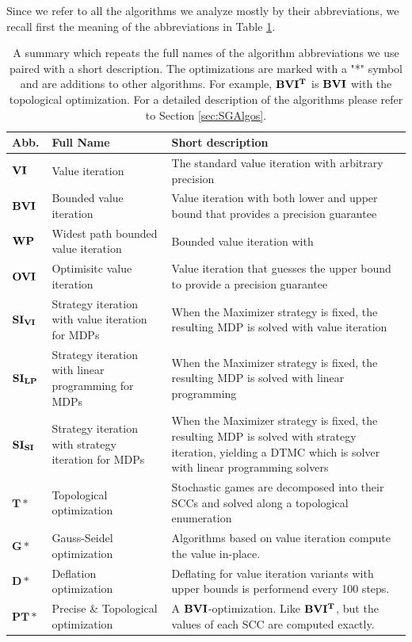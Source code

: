 Since we refer to all the algorithms we analyze mostly by their abbreviations, we recall first the meaning of the abbreviations in Table \ref{tab:recapAlgos}.
\begin{table}
    \centering
    \begin{tabular}{| p{0.1\linewidth} | p{0.3\linewidth} | p{0.6\linewidth} |}
        \hline
        Abb. & Full Name & Short description \\\hline
        $\mathbf{VI}$ & Value iteration & The standard value iteration with arbitrary precision\\
        $\mathbf{BVI}$ & Bounded value iteration & Value iteration with both lower and upper bound that provides a precision guarantee\\
        $\mathbf{WP}$ & Widest path bounded value iteration & Bounded value iteration with \\
        $\mathbf{OVI}$ & Optimisitc value iteration & Value iteration that guesses the upper bound to provide a precision guarantee\\
        $\mathbf{SI_{VI}}$ & Strategy iteration with value iteration for MDPs & When the Maximizer strategy is fixed, the resulting MDP is solved with value iteration\\
        $\mathbf{SI_{LP}}$ & Strategy iteration with linear programming for MDPs & When the Maximizer strategy is fixed, the resulting MDP is solved with linear programming\\
        $\mathbf{SI_{SI}}$ & Strategy iteration with strategy iteration for MDPs & When the Maximizer strategy is fixed, the resulting MDP is solved with strategy iteration, yielding a DTMC which is solver with linear programming solvers\\
        $\mathbf{T}*$ & Topological optimization & Stochastic games are decomposed into their SCCs and solved along a topological enumeration\\
        $\mathbf{G}*$ & Gauss-Seidel optimization & Algorithms based on value iteration compute the value in-place.\\
        $\mathbf{D}*$ & Deflation optimization & Deflating for value iteration variants with upper bounds is performend every 100 steps.\\
        $\mathbf{PT}*$ & Precise \& Topological optimization & A $\mathbf{BVI}$-optimization. Like $\mathbf{BVI^T}$, but the values of each SCC are computed exactly.\\
        \hline
    \end{tabular}
    \caption{A summary which repeats the full names of the algorithm abbreviations we use paired with a short description. 
    The optimizations are marked with a "*" symbol and are additions to other algorithms. For example, $\mathbf{BVI^T}$ is $\mathbf{BVI}$ with the topological optimization.
    For a detailed description of the algorithms please refer to Section \ref{sec:SGAlgos}.}
    \label{tab:recapAlgos}
\end{table}

